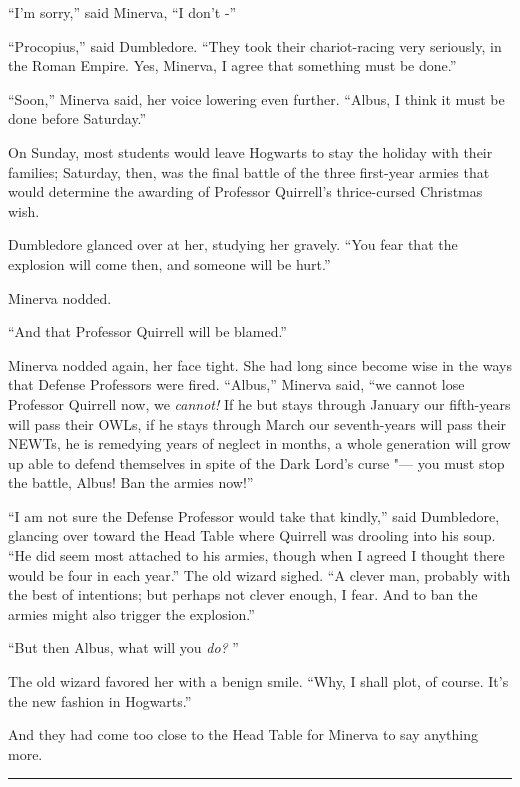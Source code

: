 ``I'm sorry,'' said Minerva, ``I don't -''

``Procopius,'' said Dumbledore. ``They took their chariot-racing very
seriously, in the Roman Empire. Yes, Minerva, I agree that something
must be done.''

``Soon,'' Minerva said, her voice lowering even further. ``Albus, I
think it must be done before Saturday.''

On Sunday, most students would leave Hogwarts to stay the holiday with
their families; Saturday, then, was the final battle of the three
first-year armies that would determine the awarding of Professor
Quirrell's thrice-cursed Christmas wish.

Dumbledore glanced over at her, studying her gravely. ``You fear that
the explosion will come then, and someone will be hurt.''

Minerva nodded.

``And that Professor Quirrell will be blamed.''

Minerva nodded again, her face tight. She had long since become wise in
the ways that Defense Professors were fired. ``Albus,'' Minerva said,
``we cannot lose Professor Quirrell now, we \emph{cannot!} If he but
stays through January our fifth-years will pass their OWLs, if he stays
through March our seventh-years will pass their NEWTs, he is remedying
years of neglect in months, a whole generation will grow up able to
defend themselves in spite of the Dark Lord's curse "--- you must stop the
battle, Albus! Ban the armies now!''

``I am not sure the Defense Professor would take that kindly,'' said
Dumbledore, glancing over toward the Head Table where Quirrell was
drooling into his soup. ``He did seem most attached to his armies,
though when I agreed I thought there would be four in each year.'' The
old wizard sighed. ``A clever man, probably with the best of intentions;
but perhaps not clever enough, I fear. And to ban the armies might also
trigger the explosion.''

``But then Albus, what will you \emph{do?} ''

The old wizard favored her with a benign smile. ``Why, I shall plot, of
course. It's the new fashion in Hogwarts.''

And they had come too close to the Head Table for Minerva to say
anything more.

\begin{center}\rule{3in}{0.4pt}\end{center}

